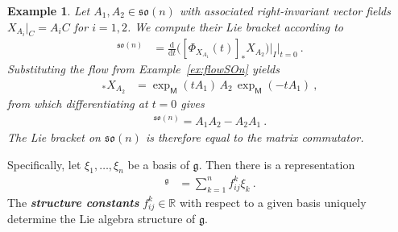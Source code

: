 \documentclass[10pt,a4paper]{article}
\theoremstyle{mytheorem}
\theoremstyle{mydefinition}
\newtheorem{example}[theorem]{Example}
\newcommand{\mydef}[1]{\textbf{\textit{#1}}}
\newcommand{\dt}{\mathrm{d}}
\newcommand{\fso}{\mathfrak{so}}
\begin{document}
\begin{example}
Let $A_1, A_2\in\fso(n)$ with associated right-invariant vector fields $X_{A_i}|_C=A_iC$ for $i=1,2$.
We compute their Lie bracket according to
\begin{align*}
	[A_1, A_2]^{\fso(n)}
	&= \frac{\dt}{\dt t}
		\big(
			[\Phi_{X_{A_1}}(t)]_* X_{A_2}
		\big)
		\big|_{I}
	\Big|_{t=0}
	\ .
\end{align*}
Substituting the flow from Example~\ref{ex:flowSOn} yields
\begin{align*}
	[\Phi_{X_{A_1}}(t)]_* X_{A_2}
	&= \exp_\mathsf{M}(tA_1)\,A_2\,\exp_\mathsf{M}(-tA_1)
	\ ,
\end{align*}
from which differentiating at $t=0$ gives
\begin{align*}
	[A_1, A_2]^{\fso(n)} = A_1A_2-A_2A_1
	\ .
\end{align*}
The Lie bracket on $\fso(n)$ is therefore equal to the matrix commutator.
\end{example}

Specifically, let $\xi_1,\ldots,\xi_n$ be a basis of $\mathfrak{g}$.
Then there is a representation
\begin{align*}
	[\xi_i,\xi_j]^\mathfrak{g}
	&= \sum_{k=1}^n f^k_{ij} \xi_k
	\ .
\end{align*}
The \mydef{structure constants} $f^k_{ij}\in\mathbb{R}$ with respect to a given basis uniquely determine the Lie algebra structure of $\mathfrak{g}$.
\end{document}
